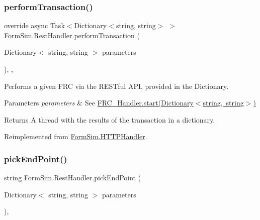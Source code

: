\mbox{\label{class_form_sim_1_1_rest_handler_aaba7a1239d5e4e2eb63e0f24f76341d1}} 
\subsubsection{\texorpdfstring{perform\+Transaction()}{performTransaction()}}
{\footnotesize\ttfamily override async Task$<$Dictionary$<$string, string$>$ $>$ Form\+Sim.\+Rest\+Handler.\+perform\+Transaction (\begin{DoxyParamCaption}\item[{Dictionary$<$ string, string $>$}]{parameters }\end{DoxyParamCaption})\hspace{0.3cm}{\ttfamily [inline]}, {\ttfamily [protected]}, {\ttfamily [virtual]}}



Performs a given F\+RC via the R\+E\+S\+Tful A\+PI, provided in the Dictionary. 


\begin{DoxyParams}{Parameters}
{\em parameters} & See \mbox{\hyperlink{interface_form_sim_1_1_f_r_c___handler_a2a2a8a776e774e5f8b5e2b7e623a26a6}{F\+R\+C\+\_\+\+Handler.\+start(\+Dictionary$<$string, string$>$)}}\\
\hline
\end{DoxyParams}
\begin{DoxyReturn}{Returns}
A thread with the results of the transaction in a dictionary.
\end{DoxyReturn}


Reimplemented from \mbox{\hyperlink{class_form_sim_1_1_h_t_t_p_handler_a1b87e232c94cf390f7a9656744006639}{Form\+Sim.\+H\+T\+T\+P\+Handler}}.

\mbox{\label{class_form_sim_1_1_rest_handler_a14a4a8f672494cea85c34f23fa508464}} 
\subsubsection{\texorpdfstring{pick\+End\+Point()}{pickEndPoint()}}
{\footnotesize\ttfamily string Form\+Sim.\+Rest\+Handler.\+pick\+End\+Point (\begin{DoxyParamCaption}\item[{Dictionary$<$ string, string $>$}]{parameters }\end{DoxyParamCaption})\hspace{0.3cm}{\ttfamily [inline]}, {\ttfamily [private]}}



